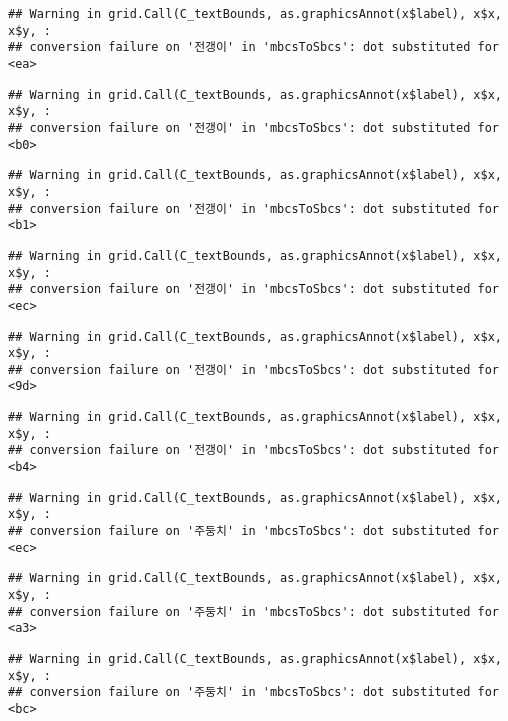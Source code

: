 \documentclass[
]{article}
\begin{document}
\begin{verbatim}
## Warning in grid.Call(C_textBounds, as.graphicsAnnot(x$label), x$x, x$y, :
## conversion failure on '전갱이' in 'mbcsToSbcs': dot substituted for <ea>
\end{verbatim}

\begin{verbatim}
## Warning in grid.Call(C_textBounds, as.graphicsAnnot(x$label), x$x, x$y, :
## conversion failure on '전갱이' in 'mbcsToSbcs': dot substituted for <b0>
\end{verbatim}

\begin{verbatim}
## Warning in grid.Call(C_textBounds, as.graphicsAnnot(x$label), x$x, x$y, :
## conversion failure on '전갱이' in 'mbcsToSbcs': dot substituted for <b1>
\end{verbatim}

\begin{verbatim}
## Warning in grid.Call(C_textBounds, as.graphicsAnnot(x$label), x$x, x$y, :
## conversion failure on '전갱이' in 'mbcsToSbcs': dot substituted for <ec>
\end{verbatim}

\begin{verbatim}
## Warning in grid.Call(C_textBounds, as.graphicsAnnot(x$label), x$x, x$y, :
## conversion failure on '전갱이' in 'mbcsToSbcs': dot substituted for <9d>
\end{verbatim}

\begin{verbatim}
## Warning in grid.Call(C_textBounds, as.graphicsAnnot(x$label), x$x, x$y, :
## conversion failure on '전갱이' in 'mbcsToSbcs': dot substituted for <b4>
\end{verbatim}

\begin{verbatim}
## Warning in grid.Call(C_textBounds, as.graphicsAnnot(x$label), x$x, x$y, :
## conversion failure on '주둥치' in 'mbcsToSbcs': dot substituted for <ec>
\end{verbatim}

\begin{verbatim}
## Warning in grid.Call(C_textBounds, as.graphicsAnnot(x$label), x$x, x$y, :
## conversion failure on '주둥치' in 'mbcsToSbcs': dot substituted for <a3>
\end{verbatim}

\begin{verbatim}
## Warning in grid.Call(C_textBounds, as.graphicsAnnot(x$label), x$x, x$y, :
## conversion failure on '주둥치' in 'mbcsToSbcs': dot substituted for <bc>
\end{verbatim}
\end{document}
